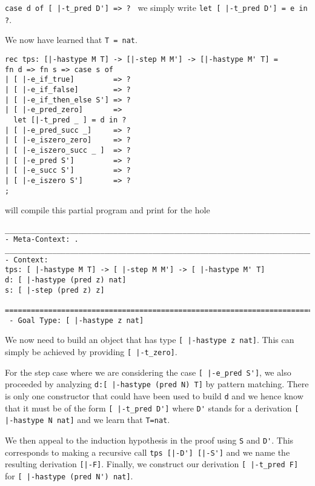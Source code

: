 \noindent
\lstinline!case d of [ |-t_pred D'] => ? ! we simply write
\lstinline!let [ |-t_pred D'] = e in ?!.


We now have learned that \lstinline!T = nat!.

\begin{lstlisting}
rec tps: [|-hastype M T] -> [|-step M M'] -> [|-hastype M' T] =
fn d => fn s => case s of
| [ |-e_if_true]         => ?
| [ |-e_if_false]        => ?
| [ |-e_if_then_else S'] => ?
| [ |-e_pred_zero]       =>
  let [|-t_pred _ ] = d in ?
| [ |-e_pred_succ _]     => ?
| [ |-e_iszero_zero]     => ?
| [ |-e_iszero_succ _ ]  => ?
| [ |-e_pred S']         => ?
| [ |-e_succ S']         => ?
| [ |-e_iszero S']       => ?
;
\end{lstlisting}

\beluga will compile this partial program and print for the hole

\begin{lstlisting}
________________________________________________________________________________
- Meta-Context: .
________________________________________________________________________________
- Context:
tps: [ |-hastype M T] -> [ |-step M M'] -> [ |-hastype M' T]
d: [ |-hastype (pred z) nat]
s: [ |-step (pred z) z]

================================================================================
 - Goal Type: [ |-hastype z nat]

\end{lstlisting}



We now need to build an object that has type
\lstinline![ |-hastype z nat]!. This can simply be achieved by
providing
\lstinline![ |-t_zero]!.


For the step case where we are considering the case
\lstinline![ |-e_pred S']!, we also proceeded by analyzing
\lstinline!d:[ |-hastype (pred N) T]! by pattern matching. There is
only one constructor that could have been used to build \lstinline!d!
and we hence know that it must be of the form
\lstinline![ |-t_pred D']! where \lstinline!D'! stands for a
derivation
\lstinline![ |-hastype N nat]! and we learn that \lstinline!T=nat!.

We then appeal to the induction hypothesis in the proof
using \lstinline!S! and \lstinline!D'!. This corresponds to making a
recursive call \lstinline!tps [|-D'] [|-S']! and we name the resulting
derivation \lstinline![|-F]!. Finally, we construct our derivation
\lstinline![ |-t_pred F]! for \lstinline![ |-hastype (pred N') nat]!.

